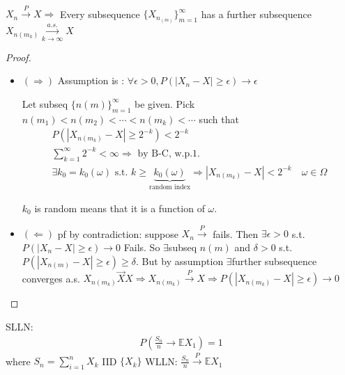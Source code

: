 \documentclass[11pt]{article}
\begin{document}
\begin{theorem}
    \,

    $X_n \overset{P}{\longrightarrow} X \Longrightarrow $ 
    Every subsequence $\{ X_{n_{(m)}} \}_{m=1}^{\infty}$ has 
    a further subsequence $X_{n(m_{k})} \overset{a.s.}{\underset{k\to \infty}{\longrightarrow}} X$
\end{theorem}
\begin{proof}
    \begin{itemize}
        \item $(\Longrightarrow)$
        Assumption is : $\forall  \epsilon > 0, P(|X_n-X| \ge \epsilon) \longrightarrow \epsilon$

        Let subseq $\{ n(m) \}_{m=1}^{\infty}$ be given. Pick $n(m_1) < n(m_2)<\cdots<n(m_{k})<\cdots$
        such that
        \begin{align*}
            P(|X_{n(m_{k})} - X| \ge 2^{-k}) < 2^{-k}\\
            \sum_{k=1}^{\infty}2^{-k} < \infty \Longrightarrow \text{ by B-C, w.p.1.}\\
            \exists k_0 = k_0(\omega) \text{ s.t. } k \ge \underbrace{k_0(\omega)}_{\text{random index}}
             \Longrightarrow 
            |X_{n(m_{k})} - X| < 2^{-k} \quad \omega \in \Omega
        \end{align*}
        \begin{remark}
            $k_0$ is random means that it is a function of $\omega$.
        \end{remark}
        \item $(\Longleftarrow)$ pf by contradiction: suppose $X_n \overset{P}{\longrightarrow}$ fails.
        Then $\exists \epsilon > 0$ s.t. $P(|X_n - X| \ge \epsilon) \longrightarrow 0$ Fails.
        So $\exists $subseq $n(m)$ and $\delta > 0$ s.t. 
        $P(|X_{n(m)} - X| \ge \epsilon) \ge \delta$. But by assumption $\exists $further subsequence
        converges a.s. $X_{n(m_{k})} \overset{\longrightarrow}{X} X \Longrightarrow
        X_{n(m_{k})} \overset{P}{\longrightarrow} X \Longrightarrow 
        P(|X_{n(m_k)} - X| \ge \epsilon) \longrightarrow 0$
    \end{itemize}
\end{proof}

\begin{theorem}
    SLLN: \begin{align*}
        P(\frac{S_n}{n} \longrightarrow \mathbb{E}X_1) = 1
    \end{align*}
    where $S_n = \sum_{i=1}^{n}X_k$ IID $\{ X_k \}$
    WLLN: $\frac{S_n}{n} \overset{P}{\longrightarrow} \mathbb{E}X_1$
\end{theorem}
\end{document}
